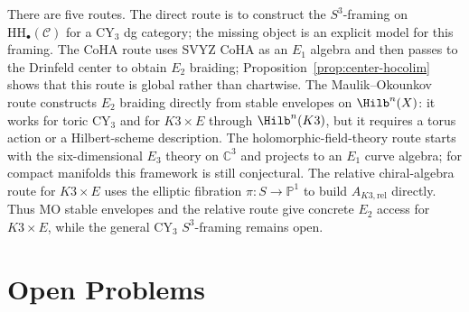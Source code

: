 \documentclass[11pt]{article}
\newcommand{\cC}{\mathcal{C}}
\newcommand{\HH}{\mathrm{HH}}
\newcommand{\CoHA}{\mathrm{CoHA}}
\newcommand{\C}{\mathbb{C}}
\theoremstyle{plain}
\theoremstyle{definition}
\theoremstyle{remark}
\begin{document}
There are five routes. The direct route is to construct the
$S^3$-framing on $\HH_\bullet(\cC)$ for a CY$_3$ dg category; the
missing object is an explicit model for this framing. The CoHA route
uses SVYZ $\CoHA$ as an $E_1$ algebra and then passes to the Drinfeld
center to obtain $E_2$ braiding; Proposition~\ref{prop:center-hocolim}
shows that this route is global rather than chartwise. The
Maulik--Okounkov route constructs $E_2$ braiding directly from stable
envelopes on $\Hilb^n(X)$: it works for toric CY$_3$ and for
$K3\times E$ through $\Hilb^n(K3)$, but it requires a torus action or a
Hilbert-scheme description. The holomorphic-field-theory route starts
with the six-dimensional $E_3$ theory on $\C^3$ and projects to an
$E_1$ curve algebra; for compact manifolds this framework is still
conjectural. The relative chiral-algebra route for $K3\times E$ uses
the elliptic fibration $\pi:S\to\mathbb{P}^1$ to build
$A_{K3,\mathrm{rel}}$ directly. Thus MO stable envelopes and the
relative route give concrete $E_2$ access for $K3\times E$, while the
general CY$_3$ $S^3$-framing remains open.

\section{Open Problems}
\end{document}

